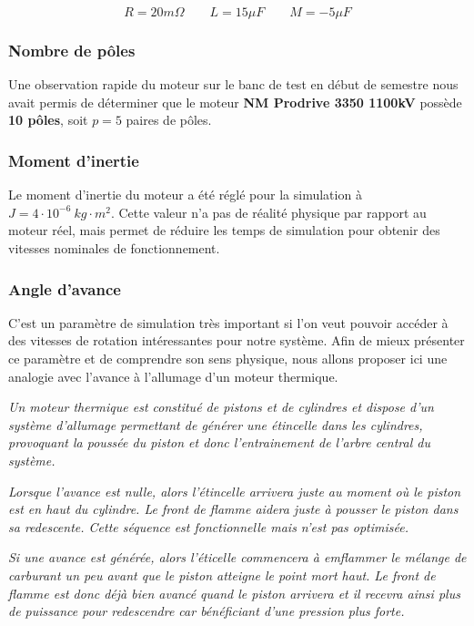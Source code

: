 			\begin{equation}
			R = 20m\Omega
			\quad\quad
			L = 15\mu F
			\quad\quad
			M = -5\mu F
			\label{values_phase}
			\end{equation}
		
			\subsubsection{Nombre de pôles}
			
			Une observation rapide du moteur sur le banc de test
			en début de semestre nous avait permis de déterminer 
			que le moteur \textbf{NM Prodrive 3350 1100kV} possède
			\textbf{10 pôles}, soit $p=5$ paires de pôles.
			
			\subsubsection{Moment d'inertie}
			
			Le moment d'inertie du moteur a été réglé pour la
			simulation à $J=4\cdot 10^{-6}\ kg \cdot m^2$.
			Cette valeur n'a pas de réalité physique par rapport
			au moteur réel, mais permet de réduire les temps de simulation
			pour obtenir des vitesses nominales de fonctionnement.
				
			\subsubsection{Angle d'avance}
					
			C'est un paramètre de simulation très important si l'on veut
			pouvoir accéder à des vitesses de rotation intéressantes pour
			notre système. Afin de mieux présenter ce paramètre et de 
			comprendre son sens physique, nous allons proposer ici une 
			analogie avec l'avance à l'allumage d'un moteur thermique.
			
			\textit{Un moteur thermique est constitué de pistons et de 
			cylindres et dispose d'un système d'allumage permettant de générer
			une étincelle dans les cylindres, provoquant la poussée du
			piston et donc l'entrainement de l'arbre central du système.}
					
			\textit{Lorsque l'avance est nulle, alors l'étincelle arrivera juste
			au moment où le piston est en haut du cylindre. Le front de flamme
			aidera juste à pousser le piston dans sa redescente. Cette séquence
			est fonctionnelle mais n'est pas optimisée.}
			
			\textit{Si une avance est générée, alors l'éticelle commencera à emflammer 
			le mélange de carburant un peu avant que le piston atteigne le point 
			mort haut. Le front de flamme est donc déjà bien avancé quand le piston
			arrivera et il recevra ainsi plus de puissance pour redescendre car 
			bénéficiant d'une pression plus forte.}
			
